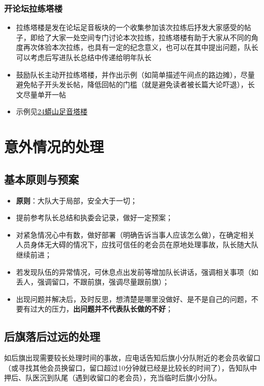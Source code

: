 \documentclass[UTF8]{ctexart}
\begin{document}
\subsubsection{开论坛拉练塔楼}

\begin{itemize}[nosep,left=2em]
    \item 拉练塔楼是发在论坛足音板块的一个收集参加该次拉练后抒发大家感受的帖子，即给了大家一处空间专门讨论本次拉练，拉练塔楼有助于大家从不同的角度再次体验本次拉练，也具有一定的纪念意义，也可以在其中提出问题，队长可以考虑后写进队长总结中传递给明年队长
    \item 鼓励队长主动开拉练塔楼，并作出示例（如简单描述午间点的路边摊），尽量避免帖子开头发长帖，降低回帖的门槛（就是避免读者被长篇大论吓退），长文尽量单开一帖
    \item 示例见\href{https://www.chexie.net/bbs/content/?bid=2&tid=8429&p=1}{24蟒山足音塔楼}
\end{itemize}

\section{意外情况的处理}


\subsection{基本原则与预案}
\begin{itemize}[nosep,left=2em]
    \item \textbf{原则}：大队大于局部，安全大于一切；
    \item 提前参考队长总结和执委会记录，做好一定预案；
    \item 对紧急情况心中有数，做好部署（明确告诉当事人应该怎么做），在确定相关人员身体无大碍的情况下，应找可信任的老会员在原地处理事故，队长随大队继续前进；
    \item 若发现队伍的异常情况，可休息点出发前等增加队长讲话，强调相关事项（如丢人，强调留口，不跟前旗，强调尽量跟前旗）；
    \item 出现问题并解决后，及时反思，想清楚是哪里没做好、是不是自己的问题，不要有过大的压力，\textbf{出问题并不代表队长做的不好}；
\end{itemize}

\subsection{后旗落后过远的处理}

如后旗出现需要较长处理时间的事故，应电话告知后旗小分队附近的老会员收留口（或寻找其他会员换留口，留口超过10分钟就已经是比较长的时间了），告知队中押后、队医沉到队尾（遇到收留口的老会员），充当临时后旗小分队。
\end{document}
